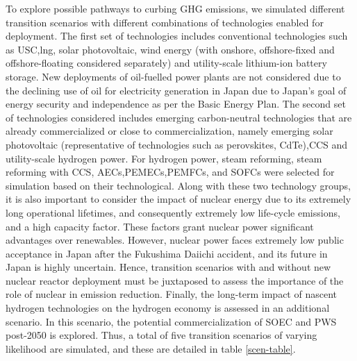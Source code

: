 To explore possible pathways to curbing \gls{GHG} emissions, we simulated different transition scenarios with different combinations of technologies enabled for deployment. The first set of technologies includes conventional technologies such as  \gls{USC},\gls{lng}, solar photovoltaic, wind energy (with onshore, offshore-fixed and offshore-floating considered separately) and utility-scale lithium-ion battery storage. New deployments of oil-fuelled power plants are not considered due to the declining use of oil for electricity generation in Japan due to Japan's goal of energy security and independence as per the Basic Energy Plan. The second set of technologies considered includes emerging carbon-neutral technologies that are already commercialized or close to commercialization, namely emerging solar photovoltaic (representative of technologies such as perovskites, CdTe),\gls{CCS} and utility-scale hydrogen power. For hydrogen power, steam reforming, steam reforming with \gls{CCS}, \gls{AEC}s,\gls{PEMEC}s,\gls{PEMFC}s, and \gls{SOFC}s were selected for simulation based on their technological. Along with these two technology groups, it is also important to consider the impact of nuclear energy due to its extremely long operational lifetimes, and consequently extremely low life-cycle emissions, and a high capacity factor. These factors grant nuclear power significant advantages over renewables. However, nuclear power faces extremely low public acceptance in Japan after the Fukushima Daiichi accident, and its future in Japan is highly uncertain. Hence, transition scenarios with and without new nuclear reactor deployment must be juxtaposed to assess the importance of the role of nuclear in emission reduction. Finally, the long-term impact of nascent hydrogen technologies on the hydrogen economy is assessed in an additional scenario. In this scenario, the potential commercialization of \gls{SOEC} and \gls{PWS} post-2050 is explored. Thus, a total of five transition scenarios of varying likelihood are simulated, and these are detailed in table \ref{scen-table}.

